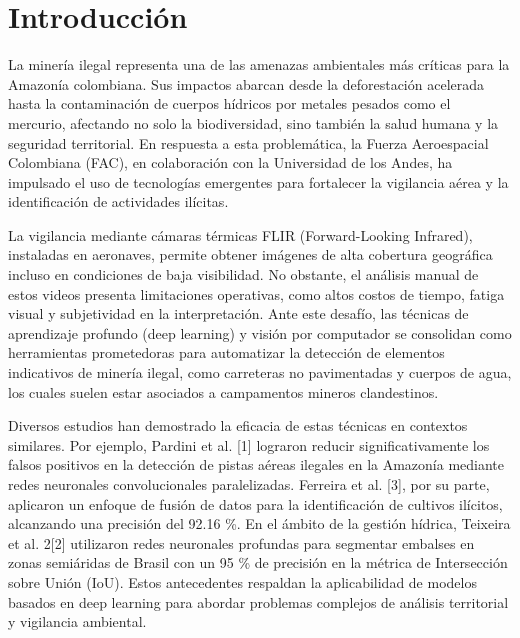 \section{Introducción}
La minería ilegal representa una de las amenazas ambientales más críticas para la Amazonía colombiana. Sus impactos abarcan desde la deforestación acelerada hasta la contaminación de cuerpos hídricos por metales pesados como el mercurio, afectando no solo la biodiversidad, sino también la salud humana y la seguridad territorial. En respuesta a esta problemática, la Fuerza Aeroespacial Colombiana (FAC), en colaboración con la Universidad de los Andes, ha impulsado el uso de tecnologías emergentes para fortalecer la vigilancia aérea y la identificación de actividades ilícitas.

La vigilancia mediante cámaras térmicas FLIR (Forward-Looking Infrared), instaladas en aeronaves, permite obtener imágenes de alta cobertura geográfica incluso en condiciones de baja visibilidad. No obstante, el análisis manual de estos videos presenta limitaciones operativas, como altos costos de tiempo, fatiga visual y subjetividad en la interpretación. Ante este desafío, las técnicas de aprendizaje profundo (deep learning) y visión por computador se consolidan como herramientas prometedoras para automatizar la detección de elementos indicativos de minería ilegal, como carreteras no pavimentadas y cuerpos de agua, los cuales suelen estar asociados a campamentos mineros clandestinos.

Diversos estudios han demostrado la eficacia de estas técnicas en contextos similares. Por ejemplo, Pardini et al. [1] lograron reducir significativamente los falsos positivos en la detección de pistas aéreas ilegales en la Amazonía mediante redes neuronales convolucionales paralelizadas. Ferreira et al. [3], por su parte, aplicaron un enfoque de fusión de datos para la identificación de cultivos ilícitos, alcanzando una precisión del 92.16 \%. En el ámbito de la gestión hídrica, Teixeira et al. 2[2] utilizaron redes neuronales profundas para segmentar embalses en zonas semiáridas de Brasil con un 95 \% de precisión en la métrica de Intersección sobre Unión (IoU). Estos antecedentes respaldan la aplicabilidad de modelos basados en deep learning para abordar problemas complejos de análisis territorial y vigilancia ambiental.

